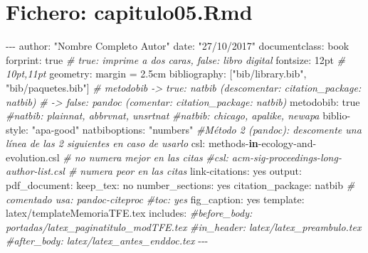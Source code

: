 \documentclass[11pt,a4paper,oneside,]{article}
\newenvironment{Shaded}{\begin{snugshade}}{\end{snugshade}}
\newcommand{\CommentTok}[1]{\textcolor[rgb]{0.56,0.35,0.01}{\textit{#1}}}
\newcommand{\ControlFlowTok}[1]{\textcolor[rgb]{0.13,0.29,0.53}{\textbf{#1}}}
\newcommand{\FloatTok}[1]{\textcolor[rgb]{0.00,0.00,0.81}{#1}}
\newcommand{\NormalTok}[1]{#1}
\newcommand{\OtherTok}[1]{\textcolor[rgb]{0.56,0.35,0.01}{#1}}
\newcommand{\SpecialCharTok}[1]{\textcolor[rgb]{0.00,0.00,0.00}{#1}}
\newcommand{\StringTok}[1]{\textcolor[rgb]{0.31,0.60,0.02}{#1}}
\numberwithin{dummy}{section}
\theoremstyle{ocrenumbox}
\theoremstyle{blacknumex}
\theoremstyle{blacknumbox}
\theoremstyle{ocrenum}
\theoremstyle{ocrenum}
\begin{document}
\hypertarget{fichero-capitulo05.rmd}{%
\section{Fichero: capitulo05.Rmd}\label{fichero-capitulo05.rmd}}

\begin{Shaded}
\begin{Highlighting}[numbers=left,,]
\SpecialCharTok{{-}{-}{-}}
\NormalTok{author}\SpecialCharTok{:} \StringTok{"Nombre Completo Autor"}
\NormalTok{date}\SpecialCharTok{:} \StringTok{"27/10/2017"}
\NormalTok{documentclass}\SpecialCharTok{:}\NormalTok{ book}
\NormalTok{forprint}\SpecialCharTok{:}\NormalTok{ true  }\CommentTok{\# true: imprime a dos caras, false: libro digital}
\NormalTok{fontsize}\SpecialCharTok{:}\NormalTok{ 12pt }\CommentTok{\# 10pt,11pt}
\NormalTok{geometry}\SpecialCharTok{:}\NormalTok{ margin }\OtherTok{=} \FloatTok{2.5}\NormalTok{cm }
\NormalTok{bibliography}\SpecialCharTok{:}\NormalTok{ [}\StringTok{"bib/library.bib"}\NormalTok{, }\StringTok{"bib/paquetes.bib"}\NormalTok{]}
\CommentTok{\# metodobib {-}\textgreater{} true: natbib (descomentar: citation\_package: natbib) }
\CommentTok{\#           {-}\textgreater{} false: pandoc (comentar: citation\_package: natbib)}
\NormalTok{metodobib}\SpecialCharTok{:}\NormalTok{ true}
\CommentTok{\#natbib: plainnat, abbrvnat, unsrtnat}
\CommentTok{\#natbib: chicago, apalike, newapa}
\NormalTok{biblio}\SpecialCharTok{{-}}\NormalTok{style}\SpecialCharTok{:} \StringTok{"apa{-}good"}
\NormalTok{natbiboptions}\SpecialCharTok{:} \StringTok{"numbers"}
\CommentTok{\#Método 2 (pandoc): descomente una línea de las 2 siguientes en caso de usarlo}
\NormalTok{csl}\SpecialCharTok{:}\NormalTok{ methods}\SpecialCharTok{{-}}\ControlFlowTok{in}\SpecialCharTok{{-}}\NormalTok{ecology}\SpecialCharTok{{-}}\NormalTok{and}\SpecialCharTok{{-}}\NormalTok{evolution.csl      }\CommentTok{\# no numera mejor en las citas}
\CommentTok{\#csl: acm{-}sig{-}proceedings{-}long{-}author{-}list.csl  \# numera peor en las citas}
\NormalTok{link}\SpecialCharTok{{-}}\NormalTok{citations}\SpecialCharTok{:}\NormalTok{ yes}
\NormalTok{output}\SpecialCharTok{:} 
\NormalTok{  pdf\_document}\SpecialCharTok{:}
\NormalTok{    keep\_tex}\SpecialCharTok{:}\NormalTok{ no}
\NormalTok{    number\_sections}\SpecialCharTok{:}\NormalTok{ yes}
\NormalTok{    citation\_package}\SpecialCharTok{:}\NormalTok{ natbib  }\CommentTok{\# comentado usa: pandoc{-}citeproc}
    \CommentTok{\#toc: yes}
\NormalTok{    fig\_caption}\SpecialCharTok{:}\NormalTok{ yes}
\NormalTok{    template}\SpecialCharTok{:}\NormalTok{ latex}\SpecialCharTok{/}\NormalTok{templateMemoriaTFE.tex}
\NormalTok{    includes}\SpecialCharTok{:}
      \CommentTok{\#before\_body: portadas/latex\_paginatitulo\_modTFE.tex}
      \CommentTok{\#in\_header: latex/latex\_preambulo.tex}
      \CommentTok{\#after\_body: latex/latex\_antes\_enddoc.tex}
\SpecialCharTok{{-}{-}{-}}


\end{Highlighting}
\end{Shaded}
\end{document}
